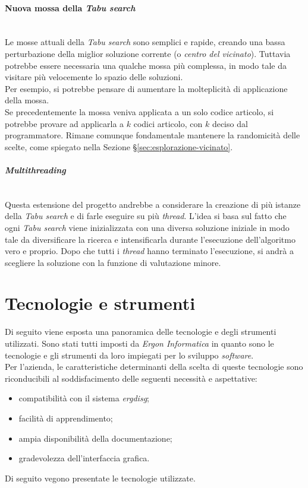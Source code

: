 \vspace*{0.3cm}
\noindent \paragraph{Nuova mossa della \textit{Tabu search}}\hfill\\
Le mosse attuali della \textit{Tabu search} sono semplici e rapide,
creando una bassa perturbazione della miglior soluzione corrente
(o \textit{centro del vicinato}). Tuttavia potrebbe essere necessaria
una qualche mossa più complessa, in modo tale da visitare
più velocemente lo spazio delle soluzioni.\\
Per esempio, si potrebbe pensare di aumentare la molteplicità
di applicazione della mossa.\\
Se precedentemente
la mossa veniva applicata a un solo codice articolo, si potrebbe
provare ad applicarla a $k$ codici articolo, con $k$
deciso dal programmatore. Rimane comunque fondamentale mantenere
la randomicità delle scelte, come spiegato nella Sezione §\ref{sec:esplorazione-vicinato}.
\vspace*{0.3cm}
\noindent \paragraph{\textit{Multithreading}}\hfill\\
Questa estensione del progetto andrebbe a considerare la
creazione di più istanze della \textit{Tabu search} e di farle eseguire su più \textit{thread}.
L'idea si basa sul fatto che ogni \textit{Tabu search} viene inizializzata
con una diversa soluzione iniziale in modo tale da diversificare
la ricerca e intensificarla durante l'esecuzione dell'algoritmo
vero e proprio.
Dopo che tutti i \textit{thread} hanno terminato l'esecuzione, si andrà
a scegliere la soluzione con la funzione di valutazione minore.

\newpage

\section{Tecnologie e strumenti}
\label{sec:tecnologie-strumenti}

\noindent Di seguito viene esposta una panoramica delle tecnologie e degli strumenti utilizzati.
Sono stati tutti imposti da \textit{Ergon Informatica} in quanto sono le tecnologie e gli strumenti
da loro impiegati per lo sviluppo \textit{software}.\\
Per l’azienda, le caratteristiche determinanti della scelta di queste tecnologie
sono riconducibili al soddisfacimento delle seguenti necessità e aspettative:
\begin{itemize}
    \item compatibilità con il sistema \textit{\gls{ergdisg}};
    \item facilità di apprendimento;
    \item ampia disponibilità della documentazione;
    \item gradevolezza dell’interfaccia grafica.
\end{itemize}
Di seguito vegono presentate le tecnologie utilizzate.



